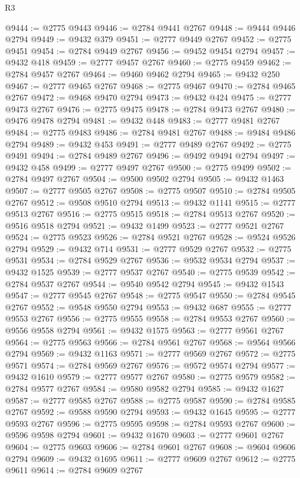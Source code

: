\begin{lexlean}{R3}
\begin{coremodule}
@9444 := @2775 @9443
@9446 := @2784 @9441 @2767
@9448 := @9444 @9446 @2794
@9449 := @9432 @379
@9451 := @2777 @9449 @2767
@9452 := @2775 @9451
@9454 := @2784 @9449 @2767
@9456 := @9452 @9454 @2794
@9457 := @9432 @418
@9459 := @2777 @9457 @2767
@9460 := @2775 @9459
@9462 := @2784 @9457 @2767
@9464 := @9460 @9462 @2794
@9465 := @9432 @250
@9467 := @2777 @9465 @2767
@9468 := @2775 @9467
@9470 := @2784 @9465 @2767
@9472 := @9468 @9470 @2794
@9473 := @9432 @424
@9475 := @2777 @9473 @2767
@9476 := @2775 @9475
@9478 := @2784 @9473 @2767
@9480 := @9476 @9478 @2794
@9481 := @9432 @448
@9483 := @2777 @9481 @2767
@9484 := @2775 @9483
@9486 := @2784 @9481 @2767
@9488 := @9484 @9486 @2794
@9489 := @9432 @453
@9491 := @2777 @9489 @2767
@9492 := @2775 @9491
@9494 := @2784 @9489 @2767
@9496 := @9492 @9494 @2794
@9497 := @9432 @458
@9499 := @2777 @9497 @2767
@9500 := @2775 @9499
@9502 := @2784 @9497 @2767
@9504 := @9500 @9502 @2794
@9505 := @9432 @1463
@9507 := @2777 @9505 @2767
@9508 := @2775 @9507
@9510 := @2784 @9505 @2767
@9512 := @9508 @9510 @2794
@9513 := @9432 @1141
@9515 := @2777 @9513 @2767
@9516 := @2775 @9515
@9518 := @2784 @9513 @2767
@9520 := @9516 @9518 @2794
@9521 := @9432 @1499
@9523 := @2777 @9521 @2767
@9524 := @2775 @9523
@9526 := @2784 @9521 @2767
@9528 := @9524 @9526 @2794
@9529 := @9432 @714
@9531 := @2777 @9529 @2767
@9532 := @2775 @9531
@9534 := @2784 @9529 @2767
@9536 := @9532 @9534 @2794
@9537 := @9432 @1525
@9539 := @2777 @9537 @2767
@9540 := @2775 @9539
@9542 := @2784 @9537 @2767
@9544 := @9540 @9542 @2794
@9545 := @9432 @1543
@9547 := @2777 @9545 @2767
@9548 := @2775 @9547
@9550 := @2784 @9545 @2767
@9552 := @9548 @9550 @2794
@9553 := @9432 @687
@9555 := @2777 @9553 @2767
@9556 := @2775 @9555
@9558 := @2784 @9553 @2767
@9560 := @9556 @9558 @2794
@9561 := @9432 @1575
@9563 := @2777 @9561 @2767
@9564 := @2775 @9563
@9566 := @2784 @9561 @2767
@9568 := @9564 @9566 @2794
@9569 := @9432 @1163
@9571 := @2777 @9569 @2767
@9572 := @2775 @9571
@9574 := @2784 @9569 @2767
@9576 := @9572 @9574 @2794
@9577 := @9432 @1610
@9579 := @2777 @9577 @2767
@9580 := @2775 @9579
@9582 := @2784 @9577 @2767
@9584 := @9580 @9582 @2794
@9585 := @9432 @1627
@9587 := @2777 @9585 @2767
@9588 := @2775 @9587
@9590 := @2784 @9585 @2767
@9592 := @9588 @9590 @2794
@9593 := @9432 @1645
@9595 := @2777 @9593 @2767
@9596 := @2775 @9595
@9598 := @2784 @9593 @2767
@9600 := @9596 @9598 @2794
@9601 := @9432 @1670
@9603 := @2777 @9601 @2767
@9604 := @2775 @9603
@9606 := @2784 @9601 @2767
@9608 := @9604 @9606 @2794
@9609 := @9432 @1695
@9611 := @2777 @9609 @2767
@9612 := @2775 @9611
@9614 := @2784 @9609 @2767

\end{coremodule}
\end{lexlean}

